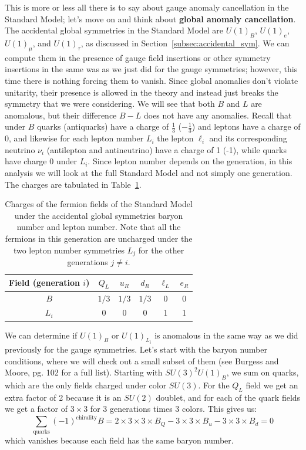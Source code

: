 \documentclass[11pt, oneside]{article}   	%
\theoremstyle{definition}
\numberwithin{equation}{subsection}		%
\begin{document}
This is more or less all there is to say about gauge anomaly cancellation in the Standard Model; let's move on and think about \textbf{global anomaly cancellation}. 
The accidental global symmetries in the Standard Model are $U(1)_B$, $U(1)_e$, $U(1)_\mu$, and $U(1)_\tau$, as discussed in Section~\ref{subsec:accidental_sym}. 
We can compute them in the presence of gauge field insertions or other symmetry insertions in the same was as we just did for the gauge symmetries; however, 
this time there is nothing forcing them to vanish. Since global anomalies don't violate unitarity, their presence is allowed in the theory and instead just breaks the 
symmetry that we were considering. We will see that both $B$ and $L$ are anomalous, but their difference $B - L$ does not have any anomalies. 
Recall that under $B$ quarks (antiquarks) have a charge of $\frac{1}{3}$ ($-\frac{1}{3}$) and leptons have a charge of 0, and likewise for each lepton number $L_i$
the lepton $\ell_i$ and its corresponding neutrino $\nu_i$ (antilepton and antineutrino) have a charge of 1 (-1), while quarks have charge 0 under $L_i$. Since lepton 
number depends on the generation, in this analysis we will look at the full Standard Model and not simply one generation. The charges are tabulated in 
Table~\ref{table:global_sm_syms}.
\begin{table}[H]
	\centering
	\begin{tabular}{ | c | c | c | c | c | c |}
		\hline
		Field (generation $i$) & $Q_L$ & $u_R$ & $d_R$ & $\ell_L$ & $e_R$ \\
		\hline
		$B$ & $1/3$ & $1/3$ & $1/3$ & 0 & 0 \\
		\hline
		$L_i$ & 0 & 0 & 0 & 1 & 1 \\
		\hline
	\end{tabular}
	\caption{Charges of the fermion fields of the Standard Model under the accidental global symmetries baryon number and lepton number. 
	Note that all the fermions in this generation are uncharged under the two lepton number symmetries $L_j$ for the other generations $j\neq i$.}
	\label{table:global_sm_syms}
\end{table}

We can determine if $U(1)_B$ or $U(1)_{L_i}$ is anomalous in the same way as we did previously for the gauge symmetries. Let's start with the baryon number conditions, 
where we will check out a small subset of them (see Burgess and Moore, pg. 102 for a full list). Starting with $SU(3)^2 U(1)_B$, we sum on quarks, which are the only fields 
charged under color $SU(3)$. For the $Q_L$ field we get an extra factor of 2 because it is an $SU(2)$ doublet, and for each of the quark fields we get a factor of 
$3\times 3$ for 3 generations times 3 colors. This gives us:
\begin{equation}
	\sum_\mathrm{quarks} (-1)^\mathrm{chirality} B = 2\times 3\times 3\times B_Q - 3\times 3\times B_u - 3\times 3\times B_d = 0
	\label{eq:global_mixed_anomaly_cancellation}
\end{equation}
which vanishes because each field has the same baryon number. 
\end{document}
